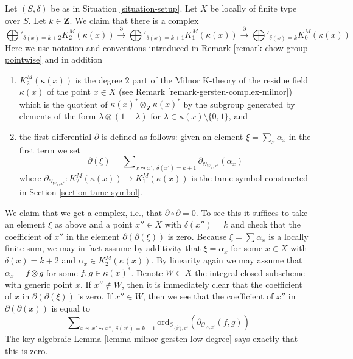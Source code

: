\begin{remark}
\label{remark-higher-chow-pointwise}
Let $(S, \delta)$ be as in Situation \ref{situation-setup}.
Let $X$ be locally of finite type over $S$. Let $k \in \mathbf{Z}$.
We claim that there is a complex
$$
\bigoplus'\nolimits_{\delta(x) = k + 2} K_2^M(\kappa(x))
\xrightarrow{\partial}
\bigoplus'\nolimits_{\delta(x) = k + 1} K_1^M(\kappa(x))
\xrightarrow{\partial}
\bigoplus'\nolimits_{\delta(x) = k} K_0^M(\kappa(x))
$$
Here we use notation and conventions introduced in
Remark \ref{remark-chow-group-pointwise} and in addition
\begin{enumerate}
\item $K_2^M(\kappa(x))$ is the degree $2$ part of
the Milnor K-theory of the residue field $\kappa(x)$ of the point
$x \in X$ (see Remark \ref{remark-gersten-complex-milnor}) which
is the quotient of $\kappa(x)^* \otimes_\mathbf{Z} \kappa(x)^*$
by the subgroup generated by elements of the form
$\lambda \otimes (1 - \lambda)$ for
$\lambda \in \kappa(x) \setminus \{0, 1\}$, and
\item the first differential $\partial$ is defined as follows:
given an element $\xi = \sum_x \alpha_x$ in the first term
we set
$$
\partial(\xi) = \sum\nolimits_{x \leadsto x',\ \delta(x') = k + 1}
\partial_{\mathcal{O}_{W_x, x'}}(\alpha_x)
$$
where
$\partial_{\mathcal{O}_{W_x, x'}} : K_2^M(\kappa(x)) \to K_1^M(\kappa(x))$
is the tame symbol constructed in Section \ref{section-tame-symbol}.
\end{enumerate}
We claim that we get a complex, i.e., that $\partial \circ \partial = 0$.
To see this it suffices to take an element $\xi$ as above and a point
$x'' \in X$ with $\delta(x'') = k$ and check that the coefficient of
$x''$ in the element $\partial(\partial(\xi))$ is zero.
Because $\xi = \sum \alpha_x$ is a locally finite sum, we
may in fact assume by additivity that $\xi = \alpha_x$ for
some $x \in X$ with $\delta(x) = k + 2$ and $\alpha_x \in K_2^M(\kappa(x))$.
By linearity again we may assume that $\alpha_x = f \otimes g$ for
some $f, g \in \kappa(x)^*$. Denote $W \subset X$ the integral closed
subscheme with generic point $x$. If $x'' \not \in W$, then it is
immediately clear that the coefficient of $x$ in $\partial(\partial(\xi))$
is zero. If $x'' \in W$, then we see that the coefficient of $x''$
in $\partial(\partial(x))$ is equal to
$$
\sum\nolimits_{x \leadsto x' \leadsto x'',\ \delta(x') = k + 1}
\text{ord}_{\mathcal{O}_{\overline{\{x'\}}, x''}}(
\partial_{\mathcal{O}_{W, x'}}(f, g))
$$
The key algebraic Lemma \ref{lemma-milnor-gersten-low-degree}
says exactly that this is zero.
\end{remark}

